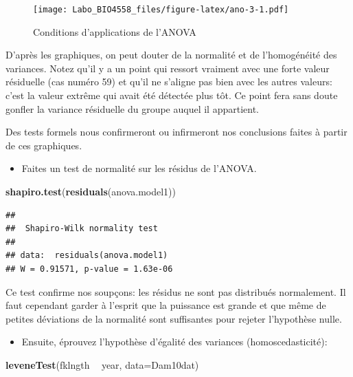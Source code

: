 \documentclass[12pt,]{book}
\newenvironment{Shaded}{\begin{snugshade}}{\end{snugshade}}
\newcommand{\DataTypeTok}[1]{\textcolor[rgb]{0.27,0.27,0.27}{#1}}
\newcommand{\KeywordTok}[1]{\textcolor[rgb]{0.27,0.27,0.27}{\textbf{#1}}}
\newcommand{\NormalTok}[1]{#1}
\newcommand{\OperatorTok}[1]{\textcolor[rgb]{0.43,0.43,0.43}{\textbf{#1}}}
\newcommand{\StringTok}[1]{\textcolor[rgb]{0.5,0.5,0.5}{#1}}
\providecommand{\tightlist}{%
  \setlength{\itemsep}{0pt}\setlength{\parskip}{0pt}}
\begin{document}
\begin{figure}
\centering
\texttt{[image: Labo\_BIO4558\_files/figure-latex/ano-3-1.pdf]}
\caption{\label{fig:ano-3}Conditions d'applications de l'ANOVA}
\end{figure}

D'après les graphiques, on peut douter de la normalité et de l'homogénéité des variances. Notez qu'il y a un point qui ressort vraiment avec une forte valeur résiduelle (cas numéro 59) et qu'il ne s'aligne pas bien avec les autres valeurs: c'est la valeur extrême qui avait été détectée plus tôt. Ce point fera sans doute gonfler la variance résiduelle du groupe auquel il appartient.

Des tests formels nous confirmeront ou infirmeront nos conclusions faites à partir de ces graphiques.

\begin{itemize}
\tightlist
\item
  Faites un test de normalité sur les résidus de l'ANOVA.
\end{itemize}

\begin{Shaded}
\begin{Highlighting}[]
\KeywordTok{shapiro.test}\NormalTok{(}\KeywordTok{residuals}\NormalTok{(anova.model1))}
\end{Highlighting}
\end{Shaded}

\begin{verbatim}
## 
## 	Shapiro-Wilk normality test
## 
## data:  residuals(anova.model1)
## W = 0.91571, p-value = 1.63e-06
\end{verbatim}

Ce test confirme nos soupçons: les résidus ne sont pas distribués normalement. Il faut cependant garder à l'esprit que la puissance est grande et que même de petites déviations de la normalité sont suffisantes pour rejeter l'hypothèse nulle.

\begin{itemize}
\tightlist
\item
  Ensuite, éprouvez l'hypothèse d'égalité des variances (homoscedasticité):
\end{itemize}

\begin{Shaded}
\begin{Highlighting}[]
\KeywordTok{leveneTest}\NormalTok{(fklngth }\OperatorTok{~}\StringTok{ }\NormalTok{year, }\DataTypeTok{data=}\NormalTok{Dam10dat)}
\end{Highlighting}
\end{Shaded}
\end{document}
